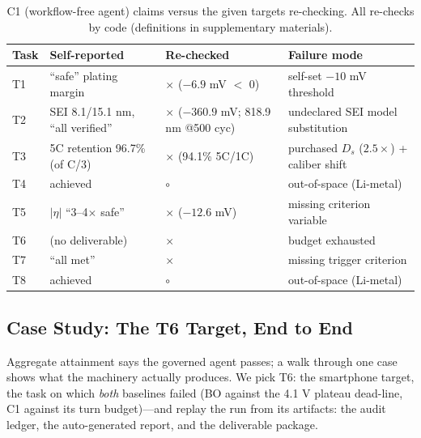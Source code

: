 \begin{table}[!ht]
\centering
\caption{C1 (workflow-free agent) claims versus the given targets
re-checking. All re-checks by code (definitions in
supplementary materials).}
\label{tab:c1}
\setlength{\tabcolsep}{2pt}
\begin{tabular}{p{0.8cm}p{3.1cm}p{3.9cm}p{4.6cm}}
\toprule
Task & Self-reported & Re-checked & Failure mode \\
\midrule
T1 & ``safe'' plating margin & $\times$ ($-6.9$ mV $<$ 0) & self-set $-10$ mV threshold \\
T2 & SEI 8.1/15.1 nm, ``all verified'' & $\times$ ($-360.9$ mV; 818.9 nm @500 cyc) & undeclared SEI model substitution \\
T3 & 5C retention 96.7\% (of C/3) & $\times$ (94.1\% 5C/1C) & purchased $D_s$ ($2.5\times$) + caliber shift \\
T4 & achieved & $\circ$ & out-of-space (Li-metal) \\
T5 & $|\eta|$ ``3--4$\times$ safe'' & $\times$ ($-12.6$ mV) & missing criterion variable \\
T6 & (no deliverable) & $\times$ & budget exhausted \\
T7 & ``all met'' & $\times$ & missing trigger criterion \\
T8 & achieved & $\circ$ & out-of-space (Li-metal) \\
\bottomrule
\end{tabular}
\end{table}

\subsection{Case Study: The T6 Target, End to End}
\label{sec:casestudy}

Aggregate attainment says the governed agent passes; a walk through one case
shows what the machinery actually produces. We pick T6: the smartphone
target, the task on which \emph{both} baselines failed (BO against the
4.1 V plateau dead-line, C1 against its turn budget)---and replay the run
from its artifacts: the audit ledger, the auto-generated report, and the
deliverable package.

